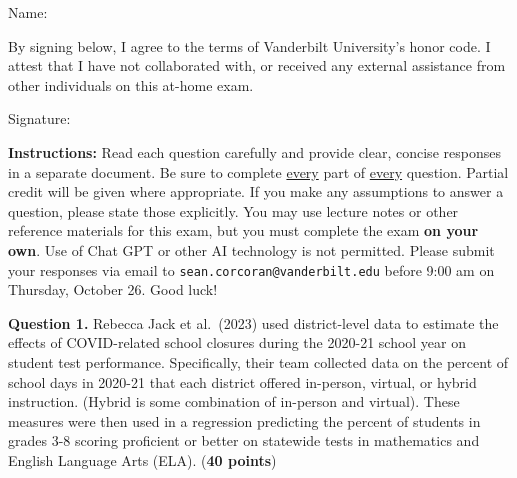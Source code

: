 \documentclass[12pt]{article}
\begin{document}
\setlength{\parindent}{0pt}

\begin{center}
\end{center}

\vspace{1.0in}

\begin{center}
\parbox{4.5in}{
	Name:\enspace\hrulefill
	
	\vspace{0.5in}
	
	By signing below, I agree to the terms of Vanderbilt University's honor code. I attest that I have not collaborated with, or received any external assistance from other individuals on this at-home exam.
	
	\vspace{.5in}
	
	Signature:\enspace\hrulefill
}
\end{center}

\vspace{0.75in}

\textbf{Instructions:} Read each question carefully and provide clear, concise responses in a separate document. Be sure to complete \underline{every} part of \underline{every} question. Partial credit will be given where appropriate. If you make any assumptions to answer a question, please state those explicitly. You may use lecture notes or other reference materials for this exam, but you must complete the exam \textbf{on your own}. Use of Chat GPT or other AI technology is not permitted. Please submit your responses via email to \texttt{sean.corcoran@vanderbilt.edu} before 9:00 am on Thursday, October 26. Good luck!


\pagebreak

\textbf{Question 1.} Rebecca Jack et al.\ (2023) used district-level data to estimate the effects of COVID-related school closures during the 2020-21 school year on student test performance. Specifically, their team collected data on the percent of school days in 2020-21 that each district offered in-person, virtual, or hybrid instruction. (Hybrid is some combination of in-person and virtual). These measures were then used in a regression predicting the percent of students in grades 3-8 scoring proficient or better on statewide tests in mathematics and English Language Arts (ELA). ({\bf 40 points}) \\
\end{document}
